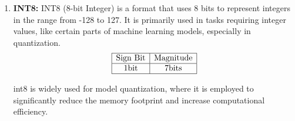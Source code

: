 \documentclass{ioereport}
\begin{document}
\begin{enumerate}[label=\textbf{\roman*.}]
    \item \textbf{INT8:}
    INT8 (8-bit Integer) is a format that uses 8 bits to represent integers in the range from -128 to 127. It is primarily used in tasks requiring integer values, like certain parts of machine learning models, especially in quantization.
    \[
    \begin{array}{|c|c|}
        \hline
        \text{Sign Bit} & \text{Magnitude} \\
        \hline
        1 \text{bit} & 7 \text{bits} \\
        \hline
    \end{array}
    \]
    
    int8 is widely used for model quantization, where it is employed to significantly reduce the memory footprint and increase computational efficiency.


\end{enumerate}
\end{document}

